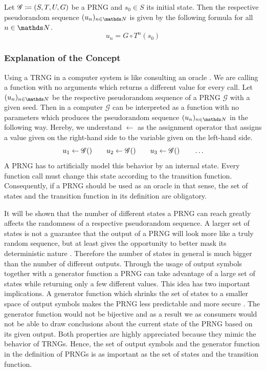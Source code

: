 \documentclass{stdlocal}
\begin{document}
    \begin{lemma}
    \label{lemma:explicit-formulation-pseudorandom-sequence}
      Let $\mathscr{G}\coloneqq (S,T,U,G)$ be a PRNG and $s_0\in S$ its initial state.
      Then the respective pseudorandom sequence $(u_n)_{n\in\setNatural}$ is given by the following formula for all $n\in\setNatural$.
      \[
        u_n = G\circ T^{n}(s_0)
      \]
    \end{lemma}

    \subsubsection{Explanation of the Concept}
    Using a TRNG in a computer system is like consulting an oracle \autocite{mueller2012}.
    We are calling a function with no arguments which returns a different value for every call.
    Let $(u_n)_{n\in\setNatural}$ be the respective pseudorandom sequence of a PRNG $\mathscr{G}$ with a given seed.
    Then in a computer $\mathscr{G}$ can be interpreted as a function with no parameters which produces the pseudorandom sequence $(u_n)_{n\in\setNatural}$ in the following way.
    Hereby, we understand $\leftarrow$ as the assignment operator that assigns a value given on the right-hand side to the variable given on the left-hand side.
    \[
      u_1 \leftarrow \mathscr{G}()
      \qquad
      u_2 \leftarrow \mathscr{G}()
      \qquad
      u_3 \leftarrow \mathscr{G}()
      \qquad
      \ldots
    \]
    A PRNG has to artificially model this behavior by an internal state.
    Every function call must change this state according to the transition function.
    Consequently, if a PRNG should be used as an oracle in that sense, the set of states and the transition function in its definition are obligatory.

    It will be shown that the number of different states a PRNG can reach greatly affects the randomness of a respective pseudorandom sequence.
    A larger set of states is not a guarantee that the output of a PRNG will look more like a truly random sequence, but at least gives the opportunity to better mask its deterministic nature \autocite{oneill2014}.
    Therefore the number of states in general is much bigger than the number of different outputs.
    Through the usage of output symbols together with a generator function a PRNG can take advantage of a large set of states while returning only a few different values.
    This idea has two important implications.
    A generator function which shrinks the set of states to a smaller space of output symbols makes the PRNG less predictable and more secure \autocite{oneill2014}.
    The generator function would not be bijective and as a result we as consumers would not be able to draw conclusions about the current state of the PRNG based on its given output.
    Both properties are highly appreciated because they mimic the behavior of TRNGs.
    Hence, the set of output symbols and the generator function in the definition of PRNGs is as important as the set of states and the transition function.
\end{document}
